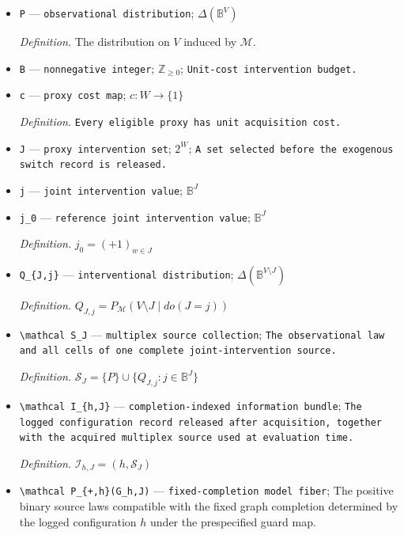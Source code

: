 \documentclass{article}
\begin{document}
\begin{itemize}
  \item \texttt{P} --- \texttt{observational distribution}; \(\Delta(\mathbb B^V)\)
  \par\smallskip\noindent\emph{Definition.} The distribution on \(V\) induced by \(\mathcal M\).
  \item \texttt{B} --- \texttt{nonnegative integer}; \(\mathbb Z_{\ge 0}\); \texttt{Unit-\allowbreak{}cost intervention budget.}
  \item \texttt{c} --- \texttt{proxy cost map}; \(c:W\to\{1\}\)
  \par\smallskip\noindent\emph{Definition.} \texttt{Every eligible proxy has unit acquisition cost.}
  \item \texttt{J} --- \texttt{proxy intervention set}; \(2^W\); \texttt{A set selected before the exogenous switch record is released.}
  \item \texttt{j} --- \texttt{joint intervention value}; \(\mathbb B^J\)
  \item \texttt{j\_\allowbreak{}0} --- \texttt{reference joint intervention value}; \(\mathbb B^J\)
  \par\smallskip\noindent\emph{Definition.} \(j_0=(+1)_{w\in J}\)
  \item \texttt{Q\_\allowbreak{}\{J,\allowbreak{}j\}\allowbreak{}} --- \texttt{interventional distribution}; \(\Delta(\mathbb B^{V\setminus J})\)
  \par\smallskip\noindent\emph{Definition.} \(Q_{J,j}=P_{\mathcal M}(V\setminus J\mid do(J=j))\)
  \item \texttt{\textbackslash{}\allowbreak{}mathcal S\_\allowbreak{}J} --- \texttt{multiplex source collection}; \texttt{The observational law and all cells of one complete joint-\allowbreak{}intervention source.}
  \par\smallskip\noindent\emph{Definition.} \(\mathcal S_J=\{P\}\cup\{Q_{J,j}:j\in\mathbb B^J\}\)
  \item \texttt{\textbackslash{}\allowbreak{}mathcal I\_\allowbreak{}\{h,\allowbreak{}J\}\allowbreak{}} --- \texttt{completion-\allowbreak{}indexed information bundle}; \texttt{The logged configuration record released after acquisition,\allowbreak{} together with the acquired multiplex source used at evaluation time.}
  \par\smallskip\noindent\emph{Definition.} \(\mathcal I_{h,J}=(h,\mathcal S_J)\)
  \item \texttt{\textbackslash{}\allowbreak{}mathcal P\_\allowbreak{}\{+\allowbreak{},\allowbreak{}h\}\allowbreak{}(G\_\allowbreak{}h,\allowbreak{}J)} --- \texttt{fixed-\allowbreak{}completion model fiber}; The positive binary source laws compatible with the fixed graph completion determined by the logged configuration \(h\) under the prespecified guard map.

\end{itemize}
\end{document}
